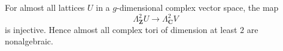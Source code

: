\begin{lemma}
\label{mumford-source-generic-nonalgebraic}
For almost all lattices $U$ in a $g$-dimensional complex vector space, the map
\[
 \Lambda^2_{\mathbf Z}U\longrightarrow\Lambda^2_{\mathbf C}V
\]
is injective. Hence almost all complex tori of dimension at least $2$ are
nonalgebraic.
\notready
\end{lemma}
